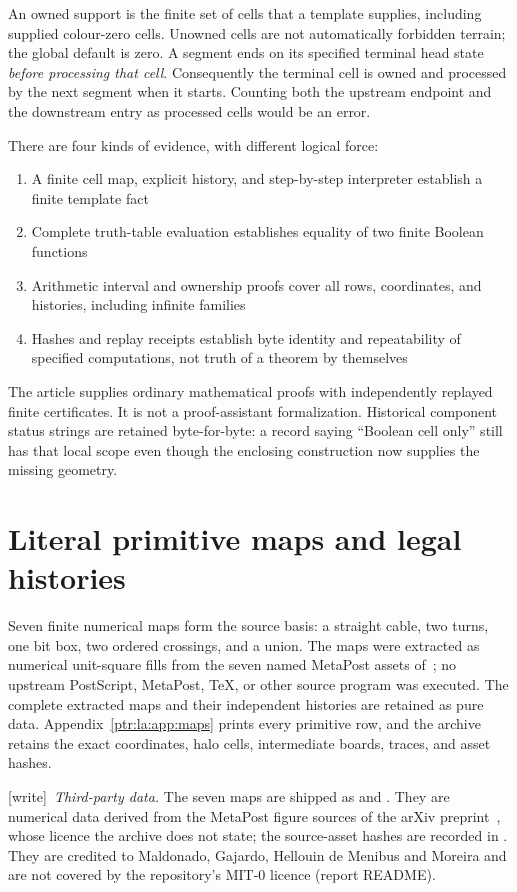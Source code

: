 \documentclass[11pt,letterpaper]{article}
\theoremstyle{definition}\newtheorem{definition}[theorem]{Definition}
\theoremstyle{remark}\newtheorem{remark}[theorem]{Remark}
\newcommand{\wtag}{\textup{[write]}}
\begin{document}
An owned support is the finite set of cells that a template supplies, including supplied colour-zero cells. Unowned cells are not automatically forbidden terrain; the global default is zero. A segment ends on its specified terminal head state \emph{before processing that cell}. Consequently the terminal cell is owned and processed by the next segment when it starts. Counting both the upstream endpoint and the downstream entry as processed cells would be an error.

There are four kinds of evidence, with different logical force:
\begin{enumerate}
\item A finite cell map, explicit history, and step-by-step interpreter establish a finite template fact
\item Complete truth-table evaluation establishes equality of two finite Boolean functions
\item Arithmetic interval and ownership proofs cover all rows, coordinates, and histories, including infinite families
\item Hashes and replay receipts establish byte identity and repeatability of specified computations, not truth of a theorem by themselves
\end{enumerate}
The article supplies ordinary mathematical proofs with independently replayed finite certificates. It is not a proof-assistant formalization. Historical component status strings are retained byte-for-byte: a record saying ``Boolean cell only'' still has that local scope even though the enclosing construction now supplies the missing geometry.

\section{Literal primitive maps and legal histories}\label{ptr:la:sec:primitives}
Seven finite numerical maps form the source basis: a straight cable, two turns, one bit box, two ordered crossings, and a union. The maps were extracted as numerical unit-square fills from the seven named MetaPost assets of~\cite{ptr:la:maldonado}; no upstream PostScript, MetaPost, TeX, or other source program was executed. The complete extracted maps and their independent histories are retained as pure data. Appendix~\ref{ptr:la:app:maps} prints every primitive row, and the archive retains the exact coordinates, halo cells, intermediate boards, traces, and asset hashes.

{\small\wtag\ \emph{Third-party data.} The seven maps are shipped as
 and
.
They are numerical data derived from the MetaPost figure sources of the
arXiv preprint~\cite{ptr:la:maldonado}, whose licence the archive does not
state; the source-asset hashes are recorded in
. They are
credited to Maldonado, Gajardo, Hellouin de Menibus and Moreira and are not
covered by the repository's MIT-0 licence (report README).\par}
\end{document}
